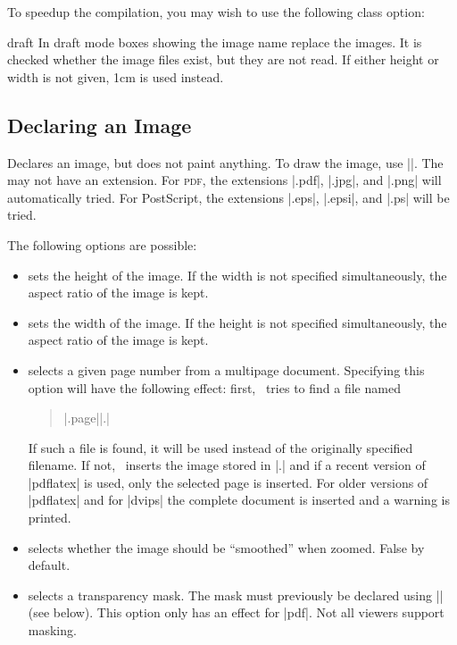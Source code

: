 To speedup the compilation, you may wish to use the following class
option:
\begin{packageoption}{draft}
  In draft mode boxes showing the image name replace the
  images. It is checked whether the image files exist, but they are
  not read. If either height or width is not given, 1cm is used
  instead.
\end{packageoption}

\subsection{Declaring an Image}

\begin{command}{\pgfdeclareimage{}}
  Declares an image, but does not paint anything. To draw the image,
  use ||. The  may not
  have an extension.  For \textsc{pdf}, the extensions |.pdf|, |.jpg|,
  and |.png| will automatically tried. For PostScript, the extensions
  |.eps|, |.epsi|, and |.ps| will be tried.

  The following options are possible:
  \begin{itemize}
  \item
     sets the height of the
    image. If the width is not specified simultaneously, the aspect
    ratio of the image is kept.
  \item
     sets the width of the
    image. If the height is not specified simultaneously, the aspect
    ratio of the image is kept.
  \item
     selects a given page number
    from a multipage document. Specifying this option will have the
    following effect: first, \pgfname\ tries to find a file named
    \begin{quote}
      |.page||.|
    \end{quote}
    If such a file is found, it will be used instead of the originally
    specified filename. If not, \pgfname\ inserts the image stored in
    |.| and if a recent version of
    |pdflatex| is used, only the selected page is inserted. For older
    versions of |pdflatex| and for |dvips| the complete document is
    inserted and a warning is printed.
  \item
     selects whether the
    image should be ``smoothed'' when zoomed. False by default.
  \item
     selects a transparency mask. The
    mask must previously be declared using |\pgfdeclaremask| (see
    below). This option only has an effect for |pdf|. Not all viewers
    support masking.
  \end{itemize}


\end{command}
